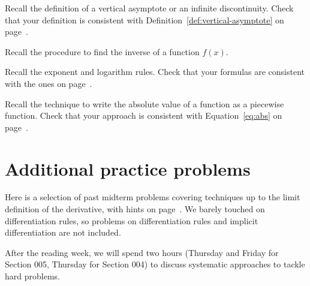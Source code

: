 \documentclass[../main.tex]{subfiles}
\begin{document}
\begin{exercise}
  Recall the definition of a vertical asymptote or an infinite discontinuity.
  Check that your definition is consistent with Definition~\ref{def:vertical-asymptote} on page~\pageref{def:vertical-asymptote}.
\end{exercise}

\begin{exercise}
  Recall the procedure to find the inverse of a function \(f(x)\).
\end{exercise}

\begin{exercise}
  Recall the exponent and logarithm rules. Check that your formulas are consistent with the ones on page~\pageref{eq:log-formulas}.
\end{exercise}

\begin{exercise}
  Recall the technique to write the absolute value of a function as a piecewise function. Check that your approach is consistent with Equation~\eqref{eq:abs} on page~\pageref{eq:abs}.
\end{exercise}

\section{Additional practice problems}


Here is a selection of past midterm problems covering techniques up to the limit definition of the derivative, with hints on page~\pageref{page:midterm-prep-hints}. We barely touched on differentiation rules, so problems on differentiation rules and implicit differentiation are not included.

After the reading week, we will spend two hours (Thursday and Friday for Section 005, Thursday for Section 004) to discuss systematic approaches to tackle hard problems.
\end{document}
